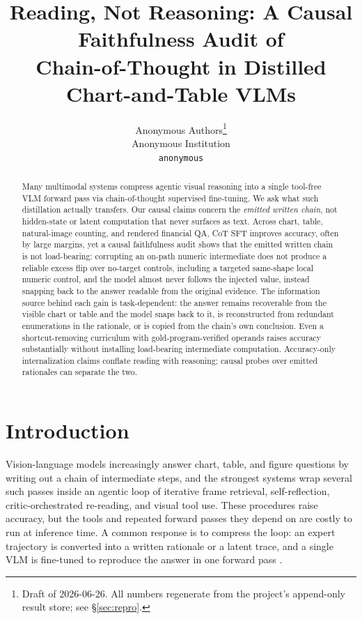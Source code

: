 \documentclass[11pt]{article}
\title{\bf Reading, Not Reasoning: A Causal Faithfulness Audit of\\ Chain-of-Thought in Distilled Chart-and-Table VLMs}
\author{%
  Anonymous Authors\thanks{Draft of 2026-06-26. All numbers regenerate from the project's append-only result store; see \S\ref{sec:repro}.}\\
  Anonymous Institution\\
  \texttt{anonymous}
}
\date{}
\begin{document}
\maketitle

\begin{abstract}
Many multimodal systems compress agentic visual reasoning into a single
tool-free VLM forward pass via chain-of-thought supervised fine-tuning.
We ask what such distillation actually transfers.  Our causal claims
concern the \emph{emitted written chain}, not hidden-state or latent
computation that never surfaces as text.
%
Across chart, table, natural-image counting, and rendered financial QA,
CoT SFT improves accuracy, often by large margins, yet a causal
faithfulness audit shows that the emitted written chain is not
load-bearing: corrupting an on-path numeric intermediate does not
produce a reliable excess flip over no-target controls, including a
targeted same-shape local numeric control, and the model almost never
follows the injected value, instead snapping back to
the answer readable from the original evidence.
%
The information source behind each gain is task-dependent: the answer
remains recoverable from the visible chart or table and the model snaps
back to it, is reconstructed from redundant enumerations in the
rationale, or is copied from the chain's own conclusion.  Even a shortcut-removing curriculum with
gold-program-verified operands raises accuracy substantially without
installing load-bearing intermediate computation.
%
Accuracy-only internalization claims conflate reading with reasoning;
causal probes over emitted rationales can separate the two.
\end{abstract}

\section{Introduction}
\label{sec:intro}

Vision-language models increasingly answer chart, table, and figure questions by writing out a chain of intermediate steps, and the strongest systems wrap several such passes inside an agentic loop of iterative frame retrieval, self-reflection, critic-orchestrated re-reading, and visual tool use. These procedures raise accuracy, but the tools and repeated forward passes they depend on are costly to run at inference time. A common response is to compress the loop: an expert trajectory is converted into a written rationale or a latent trace, and a single VLM is fine-tuned to reproduce the answer in one forward pass \citep{vpd,chartpali,pearl,zoomingwithoutzooming,locus}.
\end{document}
